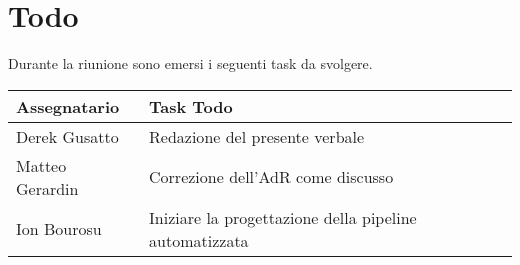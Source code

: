 \section{Todo}
Durante la riunione sono emersi i seguenti task da svolgere.

\begin{center}
  \begin{tabular}{|L{5cm}|L{8cm}|}
    \hline
    \textbf{Assegnatario} & \textbf{Task Todo} \\ \hline
     Derek Gusatto &  Redazione del presente verbale \\ \hline
     Matteo Gerardin & Correzione dell'AdR come discusso \\ \hline
     Ion Bourosu & Iniziare la progettazione della pipeline automatizzata \\ \hline

  \end{tabular}
\end{center}